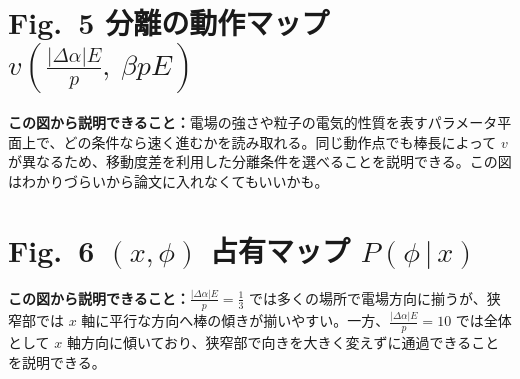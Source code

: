 \documentclass[dvipdfmx,a4paper]{jsarticle}
\newcommand{\figexplain}[1]{%
  \par\vspace{0.8em}%
  \noindent\textbf{この図から説明できること：}#1\par
}
\begin{document}
\section*{Fig.~5 分離の動作マップ $v\!\left(\frac{|\Delta \alpha|E}{p},\ \beta pE\right)$}
\begin{center}\end{center}
\figexplain{電場の強さや粒子の電気的性質を表すパラメータ平面上で、どの条件なら速く進むかを読み取れる。同じ動作点でも棒長によって $v$ が異なるため、移動度差を利用した分離条件を選べることを説明できる。この図はわかりづらいから論文に入れなくてもいいかも。}
\clearpage

\section*{Fig.~6 $(x,\phi)$ 占有マップ $P(\phi\,|\,x)$}
\begin{center}\end{center}
\figexplain{$\frac{|\Delta \alpha|E}{p}=\frac{1}{3}$ では多くの場所で電場方向に揃うが、狭窄部では $x$ 軸に平行な方向へ棒の傾きが揃いやすい。一方、$\frac{|\Delta \alpha|E}{p}=10$ では全体として $x$ 軸方向に傾いており、狭窄部で向きを大きく変えずに通過できることを説明できる。}
\end{document}
